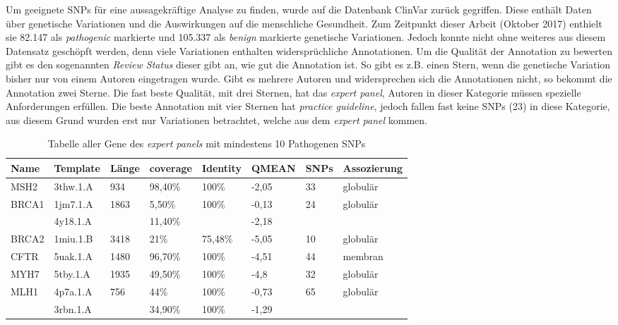 Um geeignete \ac{SNPs} für eine aussagekräftige Analyse zu finden, wurde auf die Datenbank ClinVar zurück gegriffen. Diese enthält Daten über genetische Variationen und die Auswirkungen auf die menschliche Gesundheit. Zum Zeitpunkt dieser Arbeit (Oktober 2017) enthielt sie 82.147 als \emph{pathogenic} markierte und 105.337 als \emph{benign} markierte genetische Variationen. Jedoch konnte nicht ohne weiteres aus diesem Datensatz geschöpft werden, denn viele Variationen enthalten widersprüchliche Annotationen. Um die Qualität der Annotation zu bewerten gibt es den sogenannten \emph{Review Status} dieser gibt an, wie gut die Annotation ist. So gibt es z.B. einen Stern, wenn die genetische Variation bisher nur von einem Autoren eingetragen wurde. Gibt es mehrere Autoren und widersprechen sich die Annotationen nicht, so bekommt die Annotation zwei Sterne. Die fast beste Qualität, mit drei Sternen, hat das \emph{expert panel}, Autoren in dieser Kategorie müssen spezielle Anforderungen erfüllen. Die beste Annotation mit vier Sternen hat \emph{practice guideline}, jedoch fallen fast keine \ac{SNPs} (23) in diese Kategorie, aus diesem Grund wurden erst nur Variationen betrachtet, welche aus dem \emph{expert panel} kommen. 
%
\begin{table}[]
    \centering
    \begin{tabular}{llllllll}
    \hline
    \multicolumn{1}{|l|}{Name} & \multicolumn{1}{l|}{Template} & \multicolumn{1}{l|}{Länge} & \multicolumn{1}{l|}{coverage} & \multicolumn{1}{l|}{Identity} & \multicolumn{1}{l|}{QMEAN} & \multicolumn{1}{l|}{SNPs} & \multicolumn{1}{l|}{Assozierung} \\ \hline
    \rowcolor[HTML]{9AFF99} 
    MSH2 & 3thw.1.A & 934 & 98,40\% & 100\% & -2,05 & 33 & globulär \\ \hline
    \multicolumn{1}{|l}{BRCA1} & 1jm7.1.A & 1863 & 5,50\% & 100\% & -0,13 & 24 & \multicolumn{1}{l|}{globulär} \\
    \multicolumn{1}{|l}{} & 4y18.1.A &  & 11,40\% &  & -2,18 &  & \multicolumn{1}{l|}{} \\ \hline
    BRCA2 & 1miu.1.B & 3418 & 21\% & 75,48\% & -5,05 & 10 & globulär \\
    \rowcolor[HTML]{9AFF99} 
    CFTR & 5uak.1.A & 1480 & 96,70\% & 100\% & -4,51 & 44 & membran \\
    MYH7 & 5tby.1.A & 1935 & 49,50\% & 100\% & -4,8 & 32 & globulär \\ \hline
    \multicolumn{1}{|l}{MLH1} & 4p7a.1.A & 756 & 44\% & 100\% & -0,73 & 65 & \multicolumn{1}{l|}{globulär} \\
    \multicolumn{1}{|l}{} & 3rbn.1.A &  & 34,90\% & 100\% & -1,29 &  & \multicolumn{1}{l|}{} \\ \hline
    \end{tabular}
    \caption{Tabelle aller Gene des \emph{expert panels} mit mindestens 10 Pathogenen \ac{SNPs}}
    \label{tab:expert_snps}
\end{table}

